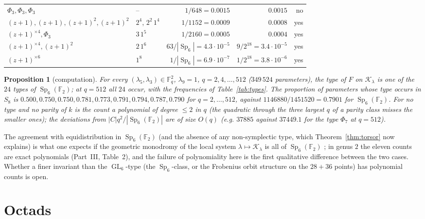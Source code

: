 \documentclass[12pt,a4paper]{amsart}
\newtheorem{proposition}[theorem]{Proposition}
\theoremstyle{definition}
\newcommand{\F}{\mathbb{F}}
\newcommand{\Sp}{\operatorname{Sp}}
\newcommand{\GL}{\operatorname{GL}}
\newcommand{\Kk}{\mathcal{K}}
\newcommand{\Fq}{\F_{q}}
\begin{document}
\begin{table}[htbp]
\begin{tabular}{llrrr}
$\Phi_3,\Phi_3,\Phi_3$ & -- & $1/648=0.0015$ & $0.0015$ & no\\
$(z+1),(z+1),(z+1)^2,(z+1)^2$ & $2^4$, $2^2\,1^4$ & $1/1152=0.0009$ & $0.0008$ & yes\\
$(z+1)^{\times4},\Phi_3$ & $3\,1^5$ & $1/2160=0.0005$ & $0.0004$ & yes\\
$(z+1)^{\times4},(z+1)^2$ & $2\,1^6$ & $63/|\Sp_6|=4.3\cdot10^{-5}$ & $9/2^{18}=3.4\cdot10^{-5}$ & yes\\
$(z+1)^{\times6}$ & $1^8$ & $1/|\Sp_6|=6.9\cdot10^{-7}$ & $1/2^{18}=3.8\cdot10^{-6}$ & yes\\
\bottomrule
\end{tabular}
\end{table}

\begin{proposition}[computation]\label{prop:stats}
For every $(\lambda_5,\lambda_3)\in\Fq^2$, $\lambda_9=1$, $q=2,4,\dots,512$ \textup{(}$349\,524$ parameters\textup{)}, the type of $F$ on $\Kk_\lambda$ is one of the $24$ types of $\Sp_6(\F_2)$; at $q=512$ all $24$ occur, with the frequencies of Table~\ref{tab:types}. The proportion of parameters whose type occurs in $S_8$ is $0.500,0.750,0.750,0.781,0.773,0.791,0.794,0.787,0.790$ for $q=2,\dots,512$, against $1146880/1451520=0.7901$ for $\Sp_6(\F_2)$. For no type and no parity of $k$ is the count a polynomial of degree $\le2$ in $q$ \textup{(}the quadratic through the three largest $q$ of a parity class misses the smaller ones\textup{)}; the deviations from $|C|q^2/|\Sp_6(\F_2)|$ are of size $O(q)$ \textup{(}e.g. $37885$ against $37449.1$ for the type $\Phi_7$ at $q=512$\textup{)}.
\end{proposition}

The agreement with equidistribution in $\Sp_6(\F_2)$ (and the absence of any non-symplectic type, which Theorem~\ref{thm:torsor} now explains) is what one expects if the geometric monodromy of the local system $\lambda\mapsto\Kk_\lambda$ is all of $\Sp_6(\F_2)$ \cite{Katz,KatzSarnak}; in genus $2$ the eleven counts are exact polynomials (Part~III, Table~2), and the failure of polynomiality here is the first qualitative difference between the two cases. Whether a finer invariant than the $\GL_6$-type (the $\Sp_6$-class, or the Frobenius orbit structure on the $28+36$ points) has polynomial counts is open.

\section{Octads}\label{sec:octad}
\end{document}
